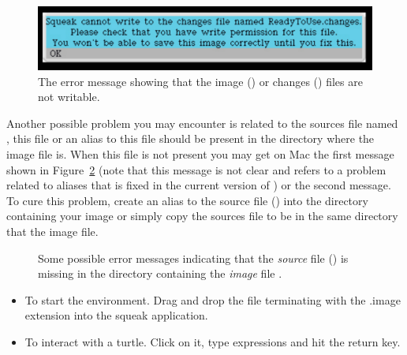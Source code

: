 \begin{figure}[!h]\centerline{\includegraphics[width=\linewidth]{changesNotWritable}}\caption{The error message showing that
 the image () or changes () files are not writable.\label{fig:readonlyfile}}
\end{figure}

Another possible problem you may encounter is related to the sources file named , this file or an alias to this file should be present in the directory where the image file is. When this file is not present you may get on Mac the first message shown in Figure~\ref{fig:sourcesMissing} (note that this message is not clear and refers to a problem related to aliases that is fixed in the current version of \sq) or the second message. To cure this problem, create an alias to the source file () into the directory containing  your image or simply copy the sources file  to be in the same directory that the image file.

\begin{figure}[!h]
\caption{Some possible error messages indicating that the \textit{source} file () is missing in the directory containing the \textit{image} file .\label{fig:sourcesMissing}}
\end{figure}


\summa

\begin{itemize}
\item To start the environment. 
Drag and drop the file terminating with the .image extension into the squeak application.
\item To interact with a turtle. Click on it, type expressions and hit the return key.
\end{itemize}